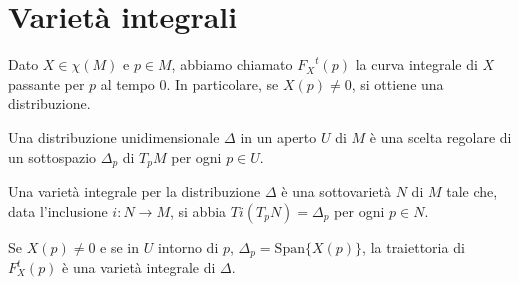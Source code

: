 \section{Varietà integrali}

Dato $X\in\chi(M)$ e $p\in M$, abbiamo chiamato ${F_X}^t(p)$ la curva integrale di $X$ passante per $p$ al tempo $0$. In particolare, se $X(p)\neq 0$, si ottiene una distribuzione.

\begin{definition}
	Una distribuzione unidimensionale $\Delta$ in un aperto $U$ di $M$ è una scelta regolare di un sottospazio $\Delta_p$ di $T_pM$ per ogni $p\in U$.
\end{definition}

\begin{definition}
	Una varietà integrale per la distribuzione $\Delta$ è una sottovarietà $N$ di $M$ tale che, data l'inclusione $i:N\to M$, si abbia $Ti(T_pN)=\Delta_p$ per ogni $p\in N$.
\end{definition}

Se $X(p)\neq 0$ e se in $U$ intorno di $p$, $\Delta_p=\text{Span}\{X(p)\}$, la traiettoria di $F_X^t(p)$ è una varietà integrale di $\Delta$. 






























